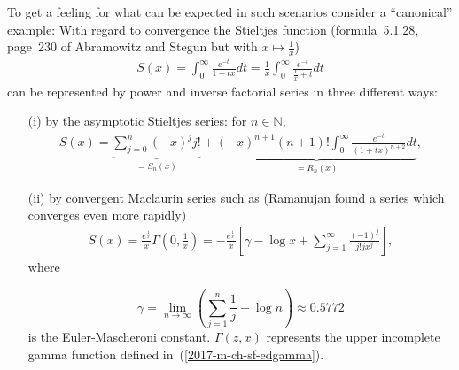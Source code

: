 {
\color{blue}
\bexample


To get a feeling for what can be expected in such scenarios
consider a ``canonical'' example:
With regard to convergence
the Stieltjes function\cite{Bleistein-Handelsman}
(formula~5.1.28, page~230 of Abramowitz and Stegun\cite[0mm]{abramowitz:1964:hmf} but with $x \mapsto \frac{1}{x}$)
\begin{equation}
\begin{split}
S(x)   = \int_0^\infty    \frac{e^{-t}}{1+tx} dt  = \frac{1}{x}  \int_0^\infty    \frac{e^{-t}}{\frac{1}{x}+t} dt
\end{split}
\label{2019-m-ch-ds-Stieltjes-function}
\end{equation}
can be represented by
power and inverse factorial series in three different ways:
\begin{itemize}
\item[(i)]
by the asymptotic Stieltjes series: for $n \in \mathbb{N}$,
\begin{equation}
\begin{split}
S(x) =
   \underbrace{\sum_{j=0}^n (-x)^j j!  }_{=S_n(x)}
+  \underbrace{(-x)^{n+1}(n+1)! \int_0^\infty   \frac{e^{-t}}{(1+tx)^{n+2}} dt}_{=R_n(x)},
\end{split}
\label{2019-m-ch-ds-asymptotic-Stieltjes-series}
\end{equation}
\item[(ii)]
by convergent Maclaurin series such as (Ramanujan found a series which converges even more rapidly)
\begin{equation}
\begin{split}
S(x)
=  \frac{e^\frac{1}{x}}{x}  \Gamma \left( 0, \frac{1}{x} \right)
=  -\frac{e^\frac{1}{x}}{x}  \left[  \gamma - \log x +\sum_{j=1}^\infty \frac{(-1)^j}{j!j x^j} \right]
,
\end{split}
\label{2019-m-ch-ds-Stieltjes-series}
\end{equation}
where

\begin{equation}
\gamma
=\lim_{n\rightarrow \infty}\left(
\sum_{j=1}^n \frac{1}{j}- \log n
\right) \approx 0.5772
\end{equation}
is the Euler-Mascheroni constant.\cite[-10mm]{Sloane_oeis.org/A001620}
$\Gamma (z,x)$ represents the upper incomplete gamma function defined in~(\ref{2017-m-ch-sf-edgamma}).


\end{itemize}}
